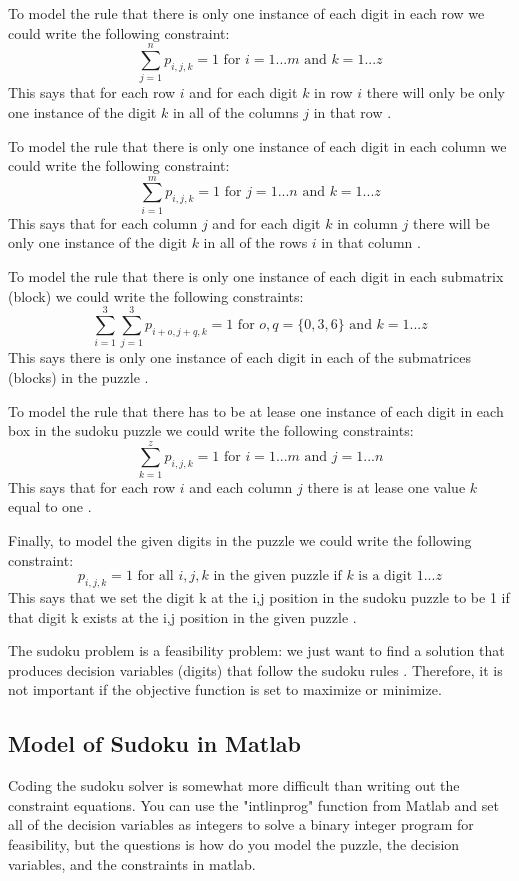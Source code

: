 \documentclass[12pt]{article}
\begin{document}
To model the rule that there is only one instance of each digit in each row we could write the following constraint:
\[
\sum_{j=1}^{n} p_{i,j,k} = 1 \text{  for } i=1...m \text{ and } k=1...z
\]
This says that for each row $i$ and for each digit $k$ in row $i$ there will only be only one instance of the digit $k$ in all of the columns $j$ in that row \cite{sudoku1}.

To model the rule that there is only one instance of each digit in each column we could write the following constraint:
\[
\sum_{i=1}^{m} p_{i,j,k} = 1 \text{  for } j=1...n \text{ and } k=1...z
\]
This says that for each column $j$ and for each digit $k$ in column $j$ there will be only one instance of the digit $k$ in all of the rows $i$ in that column \cite{sudoku1}.

To model the rule that there is only one instance of each digit in each submatrix (block) we could write the following constraints:
\[
\sum_{i=1}^{3} \sum_{j=1}^{3} p_{i+o,j+q,k} = 1 \text{  for } o,q = \{0,3,6\} \text{ and } k = 1...z 
\]
This says there is only one instance of each digit in each of the submatrices (blocks) in the puzzle \cite{sudoku2}.

To model the rule that there has to be at lease one instance of each digit in each box in the sudoku puzzle we could write the following constraints:
\[
\sum_{k=1}^{z} p_{i,j,k} = 1 \text{  for } i = 1...m \text{ and } j = 1...n
\]
This says that for each row $i$ and each column $j$ there is at lease one value $k$ equal to one \cite{sudoku1}.

Finally, to model the given digits in the puzzle we could write the following constraint:
\[
p_{i,j,k} = 1 \text{  for all } i,j,k \text{ in the given puzzle if $k$ is a digit 1...$z$}
\]
This says that we set the digit k at the i,j position in the sudoku puzzle to be 1 if that digit k exists at the i,j position in the given puzzle \cite{sudoku1}.

The sudoku problem is a feasibility problem: we just want to find a solution that produces decision variables (digits) that follow the sudoku rules \cite{sudoku1}.  Therefore, it is not important if the objective function is set to maximize or minimize.

\subsection{Model of Sudoku in Matlab}
Coding the sudoku solver is somewhat more difficult than writing out the constraint equations.  You can use the "intlinprog" function from Matlab and set all of the decision variables as integers to solve a binary integer program for feasibility, but the questions is how do you model the puzzle, the decision variables, and the constraints in matlab.
\end{document}
